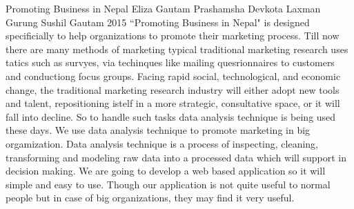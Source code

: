  \begin{conf-abstract}[]
{Promoting Business in Nepal}
{
 Eliza Gautam
 Prashamsha Devkota
 Laxman Gurung
 Sushil Gautam
}
{2015}
``Promoting Business in Nepal" is designed specificially to help organizations to promote their marketing process. Till now there are many methods of marketing typical traditional marketing research uses tatics such as survyes, via techinques like mailing quesrionnaires to customers and conductiong focus groups. Facing rapid social, technological, and economic change, the traditional marketing research industry will either adopt new tools and talent, repositioning istelf in a more strategic, consultative space, or it will fall into decline. So to handle such tasks data analysis technique is being used these days. We use data analysis technique to promote marketing in big orgamization. Data analysis technique is a process of inspecting, cleaning, transforming and modeling raw data into a processed data which will support in decision making. We are going to develop a web based application so it will simple and easy to use. Though our application is not quite useful to normal people but in case of big organizations, they may find it very useful. 
  \end{conf-abstract}